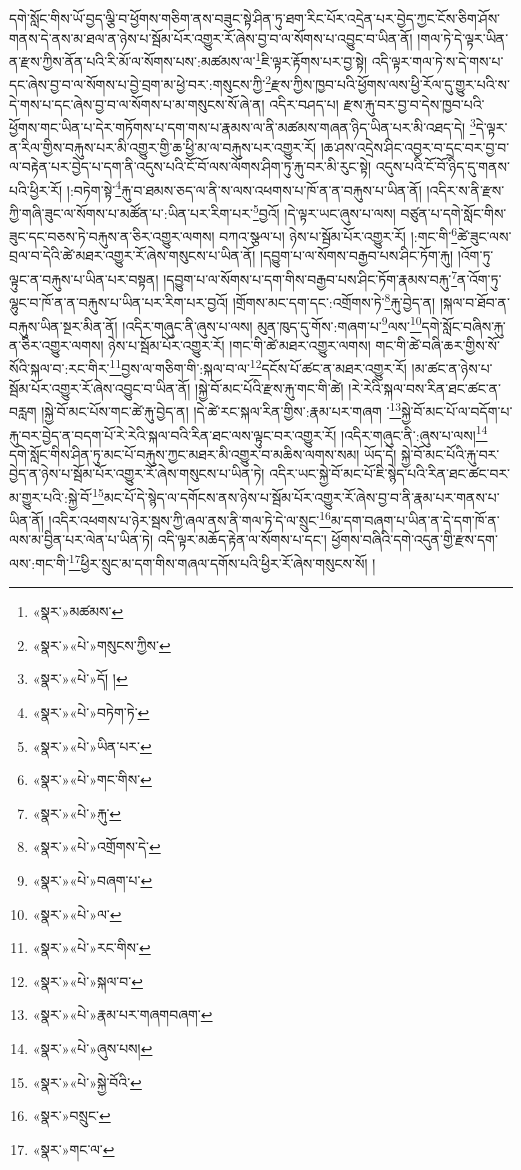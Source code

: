 དགེ་སློང་གིས་ཡོ་བྱད་ལྕི་བ་ཕྱོགས་གཅིག་ནས་བཟུང་སྟེ་ཤིན་ཏུ་ཐག་རིང་པོར་འདྲེན་པར་བྱེད་ཀྱང་ངོས་ཅིག་ཤོས་གནས་དེ་ནས་མ་ཐལ་ན་ཉེས་པ་སྦོམ་པོར་འགྱུར་རོ་ཞེས་བྱ་བ་ལ་སོགས་པ་འབྱུང་བ་ཡིན་ནོ། །གལ་ཏེ་དེ་ལྟར་ཡིན་ན་རྫས་ཀྱིས་ནོན་པའི་རི་མོ་ལ་སོགས་པས་:མཚམས་ལ་\footnote{«སྣར་»མཚམས་}ཇི་ལྟར་རྟོགས་པར་བྱ་སྟེ། འདི་ལྟར་གལ་ཏེ་ས་དེ་གས་པ་དང་ཞེས་བྱ་བ་ལ་སོགས་པ་བྱེ་བྲག་མ་ཕྱེ་བར་:གསུངས་ཀྱི་\footnote{«སྣར་»«པེ་»གསུངས་ཀྱིས་}རྫས་ཀྱིས་ཁྱབ་པའི་ཕྱོགས་ལས་ཕྱི་རོལ་དུ་གྱུར་པའི་ས་དེ་གས་པ་དང་ཞེས་བྱ་བ་ལ་སོགས་པ་མ་གསུངས་སོ་ཞེ་ན། འདིར་བཤད་པ། རྫས་རྐུ་བར་བྱ་བ་དེས་ཁྱབ་པའི་ཕྱོགས་གང་ཡིན་པ་དེར་གཏོགས་པ་དག་གས་པ་རྣམས་ལ་ནི་མཚམས་གཞན་ཉིད་ཡིན་པར་མི་འཐད་དེ། \footnote{«སྣར་»«པེ་»དོ། ། }དེ་ལྟར་ན་རིལ་གྱིས་བརྐུས་པར་མི་འགྱུར་གྱི་ཆ་ཕྱི་མ་ལ་བརྐུས་པར་འགྱུར་རོ། །ཆ་ཤས་འདྲེས་ཤིང་འབྱར་བ་དྲང་བར་བྱ་བ་ལ་བརྟེན་པར་བྱེད་པ་དག་ནི་འདུས་པའི་ངོ་བོ་ལས་ལོགས་ཤིག་ཏུ་རྐུ་བར་མི་རུང་སྟེ། འདུས་པའི་ངོ་བོ་ཉིད་དུ་གནས་པའི་ཕྱིར་རོ། །:བཏེག་སྟེ་\footnote{«སྣར་»«པེ་»བཏེག་ཏེ་}རྐུ་བ་ཐམས་ཅད་ལ་ནི་ས་ལས་འཕགས་པ་ཁོ་ན་ན་བརྐུས་པ་ཡིན་ནོ། །འདིར་ས་ནི་རྫས་ཀྱི་གཞི་ཟུང་ལ་སོགས་པ་མཚོན་པ་:ཡིན་པར་རིག་པར་\footnote{«སྣར་»«པེ་»ཡིན་པར་}བྱའོ། །དེ་ལྟར་ཡང་ཞུས་པ་ལས། བཙུན་པ་དགེ་སློང་གིས་ཟུང་དང་བཅས་ཏེ་བརྐུས་ན་ཅིར་འགྱུར་ལགས། བཀའ་སྩལ་པ། ཉེས་པ་སྦོམ་པོར་འགྱུར་རོ། །:གང་གི་\footnote{«སྣར་»«པེ་»གང་གིས་}ཚེ་ཟུང་ལས་བྲལ་བ་དེའི་ཚེ་མཐར་འགྱུར་རོ་ཞེས་གསུངས་པ་ཡིན་ནོ། །དབྱུག་པ་ལ་སོགས་བརྒྱབ་པས་ཤིང་ཏོག་རྐུ། །འོག་ཏུ་ལྟུང་ན་བརྐུས་པ་ཡིན་པར་བསྟན། །དབྱུག་པ་ལ་སོགས་པ་དག་གིས་བརྒྱབ་པས་ཤིང་ཏོག་རྣམས་བརྐུ་\footnote{«སྣར་»«པེ་»རྐུ་}ན་འོག་ཏུ་ལྷུང་བ་ཁོ་ན་ན་བརྐུས་པ་ཡིན་པར་རིག་པར་བྱའོ། །གྲོགས་མང་དག་དང་:འགྲོགས་ཏེ་\footnote{«སྣར་»«པེ་»འགྲོགས་དེ་}རྐུ་བྱེད་ན། །སྐལ་བ་ཐོབ་ན་བརྐུས་ཡིན་སྔར་མིན་ནོ། །འདིར་གཞུང་ནི་ཞུས་པ་ལས། མུན་ཁུད་དུ་གོས་:གཞག་པ་\footnote{«སྣར་»«པེ་»བཞག་པ་}ལས་\footnote{«སྣར་»«པེ་»ལ་}དགེ་སློང་བཞིས་རྐུ་ན་ཅིར་འགྱུར་ལགས། ཉེས་པ་སྦོམ་པོར་འགྱུར་རོ། །གང་གི་ཚེ་མཐར་འགྱུར་ལགས། གང་གི་ཚེ་བཞི་ཆར་གྱིས་སོ་སོའི་སྐལ་བ་:རང་གིར་\footnote{«སྣར་»«པེ་»རང་གིས་}བྱས་ལ་གཅིག་གི་:སྐལ་བ་ལ་\footnote{«སྣར་»«པེ་»སྐལ་བ་}དངོས་པོ་ཚང་ན་མཐར་འགྱུར་རོ། །མ་ཚང་ན་ཉེས་པ་སྦོམ་པོར་འགྱུར་རོ་ཞེས་འབྱུང་བ་ཡིན་ནོ། །སྐྱེ་བོ་མང་པོའི་རྫས་རྐུ་གང་གི་ཚེ། །རེ་རེའི་སྐལ་བས་རིན་ཐང་ཚང་ན་བརླག །སྐྱེ་བོ་མང་པོས་གང་ཚེ་རྐུ་བྱེད་ན། །དེ་ཚེ་རང་སྐལ་རིན་གྱིས་:རྣམ་པར་གཞག ་\footnote{«སྣར་»«པེ་»རྣམ་པར་གཞགབཞག་}སྐྱེ་བོ་མང་པོ་ལ་བདོག་པ་རྐུ་བར་བྱེད་ན་བདག་པོ་རེ་རེའི་སྐལ་བའི་རིན་ཐང་ལས་ལྟུང་བར་འགྱུར་རོ། །འདིར་གཞུང་ནི་:ཞུས་པ་ལས།\footnote{«སྣར་»«པེ་»ཞུས་པས།} དགེ་སློང་གིས་ཤིན་ཏུ་མང་པོ་བརྐུས་ཀྱང་མཐར་མི་འགྱུར་བ་མཆིས་ལགས་སམ། ཡོད་དེ། སྐྱེ་བོ་མང་པོའི་རྐུ་བར་བྱེད་ན་ཉེས་པ་སྦོམ་པོར་འགྱུར་རོ་ཞེས་གསུངས་པ་ཡིན་ཏེ། འདིར་ཡང་སྐྱེ་བོ་མང་པོ་ཇི་སྙེད་པའི་རིན་ཐང་ཚང་བར་མ་གྱུར་པའི་:སྐྱེ་བོ་\footnote{«སྣར་»«པེ་»སྐྱེ་བོའི་}མང་པོ་དེ་སྙེད་ལ་དགོངས་ནས་ཉེས་པ་སྦོམ་པོར་འགྱུར་རོ་ཞེས་བྱ་བ་ནི་རྣམ་པར་གནས་པ་ཡིན་ནོ། །འདིར་འཕགས་པ་ཉེར་སྦས་ཀྱི་ཞལ་ནས་ནི་གལ་ཏེ་དེ་ལ་སྲུང་\footnote{«སྣར་»བསྲུང་}མ་དག་བཞག་པ་ཡིན་ན་དེ་དག་ཁོ་ན་ལས་མ་བྱིན་པར་ལེན་པ་ཡིན་ཏེ། འདི་ལྟར་མཆོད་རྟེན་ལ་སོགས་པ་དང་། ཕྱོགས་བཞིའི་དགེ་འདུན་གྱི་རྫས་དག་ལས་:གང་གི་\footnote{«སྣར་»གང་ལ་}ཕྱིར་སྲུང་མ་དག་གིས་གཞལ་དགོས་པའི་ཕྱིར་རོ་ཞེས་གསུངས་སོ། །
